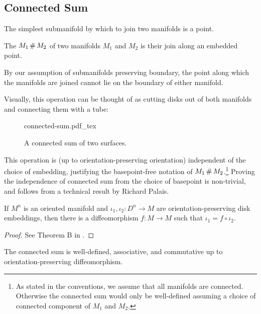 \subsection{Connected Sum}\label{sec:connected-sum}

The simplest submanifold by which to join two manifolds is a point.

\begin{definition}
	The  $M_1\+M_2$ of two manifolds $M_1$ and $M_2$ is their join along an embedded point.
\end{definition}

\begin{remark*}
	By our assumption of submanifolds preserving boundary, the point along which the manifolds are joined cannot lie on the boundary of either manifold.
\end{remark*}

Visually, this operation can be thought of as cutting disks out of both manifolds and connecting them with a tube:

\begin{figure}[ht]
	\centering
	{connected-sum.pdf_tex}
	\caption{A connected sum of two surfaces.}\label{fig:connected-sum}
\end{figure}

This operation is (up to orientation-preserving orientation) independent of the choice of embedding, justifying the basepoint-free notation of $M_1\+ M_2$.\footnote{As stated in the conventions, we assume that all manifolds are connected. Otherwise the connected sum would only be well-defined assuming a choice of connected component of $M_1$ and $M_2$.}
Proving the independence of connected sum from the choice of basepoint is non-trivial, and follows from a technical result by Richard Palais.

\begin{theorem}\label{thm:disk}
	If $M^n$ is an oriented manifold and $\iota_1, \iota_2 : D^n \to M$ are orientation-preserving disk embeddings, then there is a diffeomorphism $f : M \to M$ such that $\iota_1 = f\circ \iota_2$.
\end{theorem}
\begin{proof}
	See Theorem B in \cite{palais1960diffeomorphism}.
\end{proof}

\begin{corollary}\label{cor:connected-sum-operation}
		The connected sum is well-defined, associative, and commutative up to orientation-preserving diffeomorphism.
\end{corollary}

